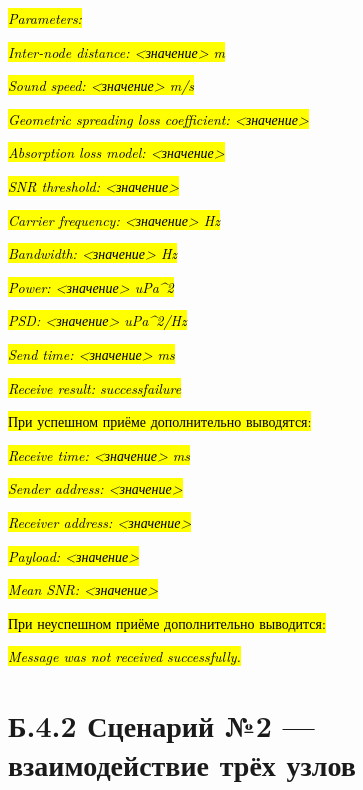 \emph{\hl{Parameters:}}

\emph{\hl{Inter-node distance: \textless значение\textgreater{} m}}

\emph{\hl{Sound speed: \textless значение\textgreater{} m/s}}

\emph{\hl{Geometric spreading loss coefficient:
\textless значение\textgreater{}}}

\emph{\hl{Absorption loss model: \textless значение\textgreater{}}}

\emph{\hl{SNR threshold: \textless значение\textgreater{}}}

\emph{\hl{Carrier frequency: \textless значение\textgreater{} Hz}}

\emph{\hl{Bandwidth: \textless значение\textgreater{} Hz}}

\emph{\hl{Power: \textless значение\textgreater{} uPa\^{}2}}

\emph{\hl{PSD: \textless значение\textgreater{} uPa\^{}2/Hz}}

\emph{\hl{Send time: \textless значение\textgreater{} ms}}

\emph{\hl{Receive result: success\textbar failure}}

\hl{При успешном приёме дополнительно выводятся:}

\emph{\hl{Receive time: \textless значение\textgreater{} ms}}

\emph{\hl{Sender address: \textless значение\textgreater{}}}

\emph{\hl{Receiver address: \textless значение\textgreater{}}}

\emph{\hl{Payload: \textless значение\textgreater{}}}

\emph{\hl{Mean SNR: \textless значение\textgreater{}}}

\hl{При неуспешном приёме дополнительно выводится:}

\hl{\emph{Message was not received successfully.}}

\section{\texorpdfstring{\hl{}}{}}\label{section-4}

\section{Б.4.2 Сценарий №2 --- взаимодействие трёх
узлов}\label{ux431.4.2-ux441ux446ux435ux43dux430ux440ux438ux439-2-ux432ux437ux430ux438ux43cux43eux434ux435ux439ux441ux442ux432ux438ux435-ux442ux440ux451ux445-ux443ux437ux43bux43eux432}

